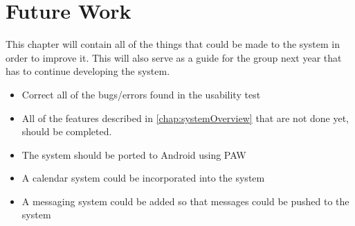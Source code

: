 \chapter{Future Work}
\label{chap:futureWork}
This chapter will contain all of the things that could be made to the system in order to improve it. This will also serve as a guide for the group next year that has to continue developing the system.
\begin{itemize}
\item Correct all of the bugs/errors found in the usability test
\item All of the features described in \vref{chap:systemOverview} that are not done yet, should be completed.
\item The system should be ported to Android using PAW
\item A calendar system could be incorporated into the system
\item A messaging system could be added so that messages could be pushed to the system
\end{itemize}